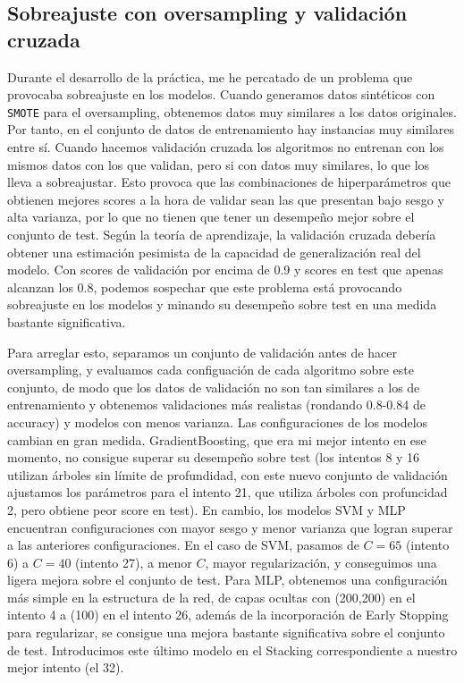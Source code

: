 \documentclass{article}
\begin{document}
\subsection{Sobreajuste con oversampling y validación
  cruzada} \label{val-sobreajuste}

Durante el desarrollo de la práctica, me he percatado de un problema
que provocaba sobreajuste en los modelos. Cuando generamos datos
sintéticos con \texttt{SMOTE} para el oversampling, obtenemos datos
muy similares a los datos originales. Por tanto, en el conjunto de
datos de entrenamiento hay instancias muy similares entre sí. Cuando
hacemos validación cruzada los algoritmos no entrenan con los mismos
datos con los que validan, pero si con datos muy similares, lo que los
lleva a sobreajustar. Esto provoca que las combinaciones de
hiperparámetros que obtienen mejores scores a la hora de validar sean
las que presentan bajo sesgo y alta varianza, por lo que no tienen que
tener un desempeño mejor sobre el conjunto de test. Según la teoría de
aprendizaje, la validación cruzada debería obtener una estimación
pesimista de la capacidad de generalización real del modelo. Con
scores de validación por encima de 0.9 y scores en test que apenas
alcanzan los 0.8, podemos sospechar que este problema está provocando
sobreajuste en los modelos y minando su desempeño sobre test en una
medida bastante significativa.

Para arreglar esto, separamos un conjunto de validación antes de hacer
oversampling, y evaluamos cada configuación de cada algoritmo sobre
este conjunto, de modo que los datos de validación no son tan
similares a los de entrenamiento y obtenemos validaciones más
realistas (rondando 0.8-0.84 de accuracy) y modelos con menos
varianza. Las configuraciones de los modelos cambian en gran
medida. GradientBoosting, que era mi mejor intento en ese momento, no
consigue superar su desempeño sobre test (los intentos 8 y 16 utilizan
árboles sin límite de profundidad, con este nuevo conjunto de
validación ajustamos los parámetros para el intento 21, que utiliza
árboles con profuncidad 2, pero obtiene peor score en test). En
cambio, los modelos SVM y MLP encuentran configuraciones con mayor
sesgo y menor varianza que logran superar a las anteriores
configuraciones. En el caso de SVM, pasamos de $C=65$ (intento 6) a
$C=40$ (intento 27), a menor $C$, mayor regularización, y conseguimos
una ligera mejora sobre el conjunto de test. Para MLP, obtenemos una
configuración más simple en la estructura de la red, de capas ocultas
con (200,200) en el intento 4 a (100) en el intento 26, además de la
incorporación de Early Stopping para regularizar, se consigue una
mejora bastante significativa sobre el conjunto de test. Introducimos
este último modelo en el Stacking correspondiente a nuestro mejor
intento (el 32).
\end{document}
